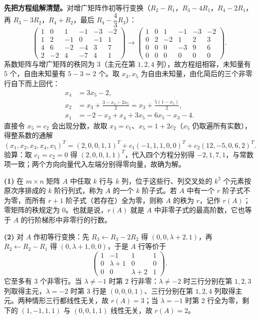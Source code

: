 \begin{solution}
\textbf{先把方程组解清楚。}对增广矩阵作初等行变换（$R_2-R_1$，$R_3-4R_1$，$R_4-2R_1$，再 $R_3-3R_2$，$R_4+R_2$，最后 $R_4-\dfrac43R_3$）：
\[
\begin{pmatrix}
1&0&1&-1&-3&-2\\
1&2&-1&0&-1&1\\
4&6&-2&-4&3&7\\
2&-2&4&-7&4&1
\end{pmatrix}
\to
\begin{pmatrix}
1&0&1&-1&-3&-2\\
0&2&-2&1&2&3\\
0&0&0&-3&9&6\\
0&0&0&0&0&0
\end{pmatrix}.
\]
系数矩阵与增广矩阵的秩同为 $3$（主元在第 $1,2,4$ 列），故方程组相容，未知量有 $5$ 个，自由未知量有 $5-3=2$ 个。取 $x_3,x_5$ 为自由未知量，由化简后的三个非零行自下而上回代：
\begin{align*}
x_4&=3x_5-2,\\
x_2&=x_3+\frac{3-x_4-2x_5}{2}=x_3+\frac{5(1-x_5)}{2},\\
x_1&=-2-x_3+x_4+3x_5=6x_5-x_3-4 .
\end{align*}
直接令 $x_5=c_2$ 会出现分数，故取 $x_3=c_1$、$x_5=1+2c_2$（$x_5$ 仍取遍所有实数），得整系数的通解
\[
(x_1,x_2,x_3,x_4,x_5)^{T}=(2,0,0,1,1)^{T}+c_1(-1,1,1,0,0)^{T}+c_2(12,-5,0,6,2)^{T}.
\]
验算：取 $c_1=c_2=0$ 得 $(2,0,0,1,1)^{T}$，代入四个方程分别得 $-2,1,7,1$，与常数项一致；两个方向向量代入左端分别得零向量，故确为解。
\end{solution}

\begin{solution}
\textbf{(1)} 在 $m\times n$ 矩阵 $A$ 中任取 $k$ 行与 $k$ 列，位于这些行、列交叉处的 $k^{2}$ 个元素按原次序排成的 $k$ 阶行列式，称为 $A$ 的一个 $k$ 阶子式。若 $A$ 中有一个 $r$ 阶子式不为零，而所有 $r+1$ 阶子式（若存在）全为零，则称 $A$ 的秩为 $r$，记作 $r(A)$；零矩阵的秩规定为 $0$。也就是说，$r(A)$ 就是 $A$ 中非零子式的最高阶数，它也等于 $A$ 的行阶梯形中非零行的行数。

\textbf{(2)} 对 $A$ 作初等行变换：先 $R_3\leftarrow R_3-2R_2$ 得 $(0,0,\lambda+2,1)$，再 $R_2\leftarrow R_2-R_1$ 得 $(0,\lambda+1,0,0)$，于是 $A$ 行等价于
\[
\begin{pmatrix}1&-1&1&1\\0&\lambda+1&0&0\\0&0&\lambda+2&1\end{pmatrix}.
\]
它至多有 $3$ 个非零行。当 $\lambda\ne-1$ 时第 $2$ 行非零：$\lambda\ne-2$ 时三行分别在第 $1,2,3$ 列取得主元，$\lambda=-2$ 时第 $3$ 行是 $(0,0,0,1)$、三行分别在第 $1,2,4$ 列取得主元。两种情形三行都线性无关，故 $r(A)=3$；当 $\lambda=-1$ 时第 $2$ 行全为零，剩下的 $(1,-1,1,1)$ 与 $(0,0,1,1)$ 线性无关，故 $r(A)=2$。
\end{solution}

